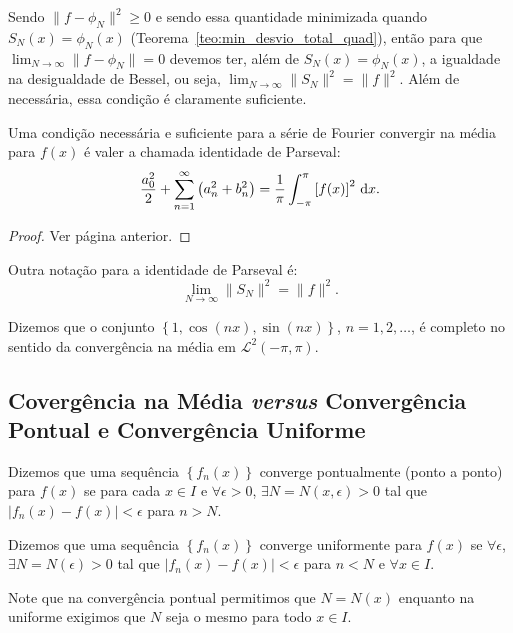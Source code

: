 Sendo $\| f - \phi_N \|^2 \geq 0$ e sendo essa quantidade minimizada quando
$S_N(x) = \phi_N(x)$ (Teorema~\ref{teo:min_desvio_total_quad}), então para que
$\lim_{N \to \infty} \| f - \phi_N \| = 0$ devemos ter, além de $S_N(x) =
\phi_N(x)$, a igualdade na desigualdade de Bessel, ou seja, $\lim_{N \to \infty}
\| S_N \|^2 = \| f \|^2$. Além de necessária, essa condição é claramente
suficiente.

\begin{teo}
  Uma condição necessária e suficiente para a série de Fourier convergir na
  média para $f(x)$ é valer a chamada identidade de Parseval:
  \begin{dmath*}
    \frac{a_0^2}{2} + \sum_{n = 1}^\infty \left( a_n^2 + b_n^2 \right) =
    \frac{1}{\pi} \int_{-\pi}^\pi \left[ f(x) \right]^2 \vi{x}.
  \end{dmath*}
\end{teo}
\begin{proof}
  Ver página anterior.
\end{proof}

Outra notação para a identidade de Parseval é:
\begin{dmath*}
  \lim_{N \to \infty} \| S_N \|^2 = \| f \|^2.
\end{dmath*}

\begin{obs}
  Dizemos que o conjunto $\left\{ 1, \cos\left( n x \right), \sin\left( n x
  \right) \right\}$, $n = 1, 2, \ldots$, é completo no sentido da convergência
  na média em $\mathcal{L}^2(-\pi, \pi)$.
\end{obs}

\subsection{Covergência na Média \textit{versus} Convergência Pontual e
Convergência Uniforme}
Dizemos que uma sequência $\left\{ f_n(x) \right\}$ converge pontualmente (ponto
a ponto) para $f(x)$ se para cada $x \in I$ e $\forall \epsilon > 0$, $\exists N
= N(x, \epsilon) > 0$ tal que $| f_n(x) - f(x) | < \epsilon$ para $n > N$.

Dizemos que uma sequência $\left\{ f_n(x) \right\}$ converge uniformente para
$f(x)$ se $\forall \epsilon$, $\exists N = N(\epsilon) > 0$ tal que $| f_n(x) -
f(x) | < \epsilon$ para $n < N$ e $\forall x \in I$.

\begin{obs}
  Note que na convergência pontual permitimos que $N = N(x)$ enquanto na
  uniforme exigimos que $N$ seja o mesmo para todo $x \in I$.
\end{obs}

